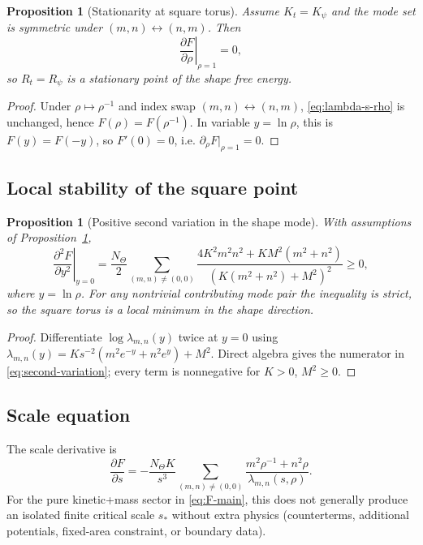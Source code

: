 \documentclass[12pt,a4paper]{article}
\newtheorem{proposition}[theorem]{Proposition}
\theoremstyle{definition}
\theoremstyle{remark}
\begin{document}
\begin{proposition}[Stationarity at square torus]
\label{prop:shape-stationary}
Assume $K_t=K_\psi$ and the mode set is symmetric under $(m,n)\leftrightarrow(n,m)$.
Then
\begin{equation}
\left.\frac{\partial F}{\partial \rho}\right|_{\rho=1}=0,
\end{equation}
so $R_t=R_\psi$ is a stationary point of the shape free energy.
\end{proposition}

\begin{proof}
Under $\rho\mapsto\rho^{-1}$ and index swap $(m,n)\leftrightarrow(n,m)$,
\eqref{eq:lambda-s-rho} is unchanged, hence $F(\rho)=F(\rho^{-1})$.
In variable $y=\ln\rho$, this is $F(y)=F(-y)$, so $F'(0)=0$, i.e.
$\partial_\rho F|_{\rho=1}=0$.
\end{proof}

\subsection{Local stability of the square point}

\begin{proposition}[Positive second variation in the shape mode]
\label{prop:shape-stable}
With assumptions of Proposition~\ref{prop:shape-stationary},
\begin{equation}
\left.\frac{\partial^2 F}{\partial y^2}\right|_{y=0}
=\frac{N_\Theta}{2}\sum_{(m,n)\neq(0,0)}
\frac{4K^2m^2n^2+KM^2(m^2+n^2)}{\left(K(m^2+n^2)+M^2\right)^2}
\ge 0,
\label{eq:second-variation}
\end{equation}
where $y=\ln\rho$. For any nontrivial contributing mode pair the inequality is
strict, so the square torus is a local minimum in the shape direction.
\end{proposition}

\begin{proof}
Differentiate $\log\lambda_{m,n}(y)$ twice at $y=0$ using
$\lambda_{m,n}(y)=Ks^{-2}(m^2e^{-y}+n^2e^{y})+M^2$.
Direct algebra gives the numerator in \eqref{eq:second-variation}; every term is
nonnegative for $K>0$, $M^2\ge0$.
\end{proof}

\subsection{Scale equation}

The scale derivative is
\begin{equation}
\frac{\partial F}{\partial s}
=-\frac{N_\Theta K}{s^3}
\sum_{(m,n)\neq(0,0)}
\frac{m^2\rho^{-1}+n^2\rho}{\lambda_{m,n}(s,\rho)}.
\label{eq:scale-derivative}
\end{equation}
For the pure kinetic+mass sector in \eqref{eq:F-main}, this does not generally
produce an isolated finite critical scale $s_*$ without extra physics
(counterterms, additional potentials, fixed-area constraint, or boundary data).
\end{document}
